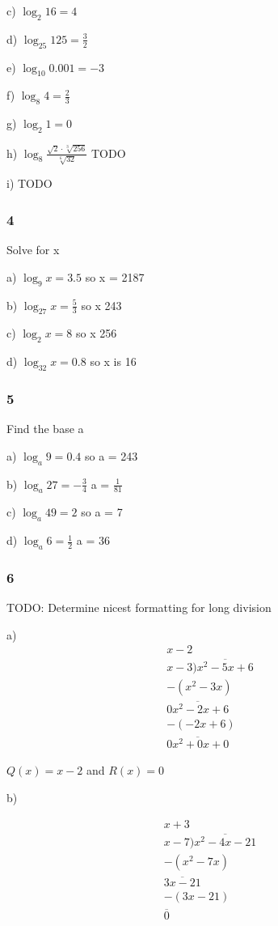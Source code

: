 \documentclass[]{report}
\begin{document}
c) $\log_2 16 = 4$

d) $\log_{25} 125 = \frac{3}{2}$

e) $\log_{10} 0.001 = -3$

f) $\log_8 4 = \frac{2}{3}$

g) $\log_2 1 = 0$

h) $\log_8 \frac{\sqrt{2} \cdot \sqrt[3]{256}}{\sqrt[6]{32}}$ TODO

i) TODO


\subsubsection{4}

Solve for x

a) $\log_9 x = 3.5$ so x = 2187

b) $\log_{27} x = \frac{5}{3}$ so x 243

c) $\log_2 x = 8 $ so x 256

d) $\log_{32}x = 0.8$ so x is 16

\subsubsection{5}

Find the base a

a) $\log_a 9 = 0.4$ so a = 243

b) $\log_a 27 = -\frac{3}{4}$ a = $\frac{1}{81}$

c) $\log_a 49 = 2$ so a = 7

d) $\log_a 6 = \frac{1}{2}$ a = 36

\subsubsection{6}

TODO: Determine nicest formatting for long division

a) 
\begin{align*}
	x - 2\\
x-3 ) \overline{x^2 - 5x + 6}\\
- (x^2 -3x)\\
\overline{0x^2 -2x + 6} \\
- (-2x + 6)\\
\overline{0x^2 + 0x + 0}
\end{align*}

$Q(x) = x-2 $ and $R(x) = 0$

b)

\begin{align*}
x + 3\\
x-7) \overline{x^2 -4x -21}\\
- (x^2 - 7x)\\
\overline{3x - 21}\\
-(3x - 21)\\
\overline{0}
\end{align*}
\end{document}
